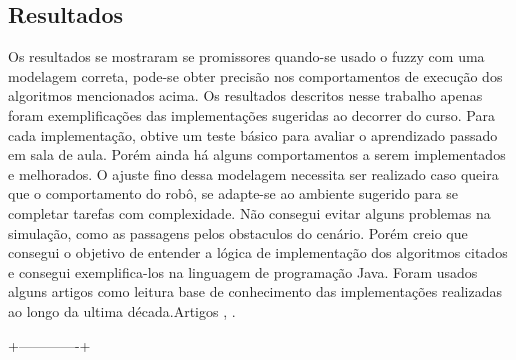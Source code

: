\documentclass[twoside,conference,a4paper]{IEEEtran}
\begin{document}
\subsection{Resultados}

Os resultados se mostraram se promissores quando-se usado o fuzzy com uma modelagem correta, pode-se obter precisão nos comportamentos de execução dos algoritmos mencionados acima. Os resultados descritos nesse trabalho apenas foram exemplificações das implementações sugeridas ao decorrer do curso. Para cada implementação, obtive um teste básico para avaliar o aprendizado passado em sala de aula.
Porém ainda há alguns comportamentos a serem implementados e melhorados. O ajuste fino dessa modelagem necessita ser realizado caso queira que o comportamento do robô, se adapte-se ao ambiente sugerido para se completar tarefas com complexidade.
Não consegui evitar alguns problemas na simulação, como as passagens pelos obstaculos do cenário.
Porém creio que consegui o objetivo de entender a lógica de implementação dos algoritmos citados e consegui exemplifica-los na linguagem de programação Java.
Foram usados alguns artigos como leitura base de conhecimento das implementações realizadas ao longo da ultima década.Artigos \cite{Omrane:2016}, \cite{Beom:1995}.





 +-------------+






\end{document}
